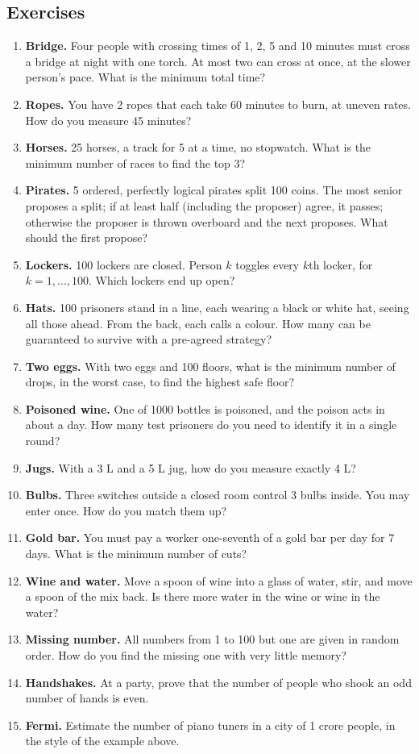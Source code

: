 \documentclass[11pt,a4paper,openany]{report}
\newenvironment{exercises}{\subsection*{Exercises \thechapter}\begin{enumerate}[label=\textbf{\thechapter.\arabic*},leftmargin=3.2em]}{\end{enumerate}}
\begin{document}
\begin{exercises}
\item \textbf{Bridge.} Four people with crossing times of 1, 2, 5 and 10 minutes must cross a bridge at night with one torch. At most two can cross at once, at the slower person's pace. What is the minimum total time?
\item \textbf{Ropes.} You have 2 ropes that each take 60 minutes to burn, at uneven rates. How do you measure 45 minutes?
\item \textbf{Horses.} 25 horses, a track for 5 at a time, no stopwatch. What is the minimum number of races to find the top 3?
\item \textbf{Pirates.} 5 ordered, perfectly logical pirates split 100 coins. The most senior proposes a split; if at least half (including the proposer) agree, it passes; otherwise the proposer is thrown overboard and the next proposes. What should the first propose?
\item \textbf{Lockers.} 100 lockers are closed. Person $k$ toggles every $k$th locker, for $k=1,\dots,100$. Which lockers end up open?
\item \textbf{Hats.} 100 prisoners stand in a line, each wearing a black or white hat, seeing all those ahead. From the back, each calls a colour. How many can be guaranteed to survive with a pre-agreed strategy?
\item \textbf{Two eggs.} With two eggs and 100 floors, what is the minimum number of drops, in the worst case, to find the highest safe floor?
\item \textbf{Poisoned wine.} One of 1000 bottles is poisoned, and the poison acts in about a day. How many test prisoners do you need to identify it in a single round?
\item \textbf{Jugs.} With a 3 L and a 5 L jug, how do you measure exactly 4 L?
\item \textbf{Bulbs.} Three switches outside a closed room control 3 bulbs inside. You may enter once. How do you match them up?
\item \textbf{Gold bar.} You must pay a worker one-seventh of a gold bar per day for 7 days. What is the minimum number of cuts?
\item \textbf{Wine and water.} Move a spoon of wine into a glass of water, stir, and move a spoon of the mix back. Is there more water in the wine or wine in the water?
\item \textbf{Missing number.} All numbers from 1 to 100 but one are given in random order. How do you find the missing one with very little memory?
\item \textbf{Handshakes.} At a party, prove that the number of people who shook an odd number of hands is even.
\item \textbf{Fermi.} Estimate the number of piano tuners in a city of 1 crore people, in the style of the example above.
\end{exercises}
\end{document}
